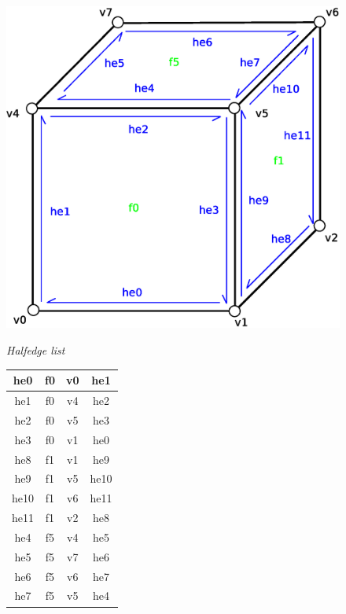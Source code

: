 \begin{figure}[h]

\begin{minipage}[hb]{0.65\linewidth}
\centering
\includegraphics[width=0.6\linewidth]{../img/he_rep_mesh.eps}
\label{fig:figure1}
\end{minipage}
\hspace{0.5cm}
\begin{minipage}[hb]{0.25\linewidth}
\centering
\emph{Halfedge list}
\vspace{1mm}

\begin{tabular}{|c|c|c|c|}
\hline
\textsf{he0} & \textsf{f0} & \textsf{v0} & \textsf{he1}\\
\hline
\textsf{he1} & \textsf{f0} & \textsf{v4} & \textsf{he2}\\
\hline
\textsf{he2} & \textsf{f0} & \textsf{v5} & \textsf{he3}\\
\hline
\textsf{he3} & \textsf{f0} & \textsf{v1} & \textsf{he0}\\
\hline

\hline
\textsf{he8} & \textsf{f1} & \textsf{v1} & \textsf{he9}\\
\hline
\textsf{he9} & \textsf{f1} & \textsf{v5} & \textsf{he10}\\
\hline
\textsf{he10} & \textsf{f1} & \textsf{v6} & \textsf{he11}\\
\hline
\textsf{he11} & \textsf{f1} & \textsf{v2} & \textsf{he8}\\
\hline

\hline
\textsf{he4} & \textsf{f5} & \textsf{v4} & \textsf{he5}\\
\hline
\textsf{he5} & \textsf{f5} & \textsf{v7} & \textsf{he6}\\
\hline
\textsf{he6} & \textsf{f5} & \textsf{v6} & \textsf{he7}\\
\hline
\textsf{he7} & \textsf{f5} & \textsf{v5} & \textsf{he4}\\
\hline
\end{tabular}
\label{fig:figure2}
\end{minipage}

\end{figure}
